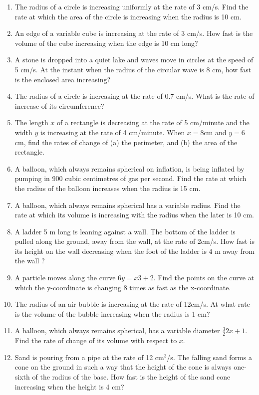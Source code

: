 \begin{enumerate}[label=\arabic*.,ref=\thesubsection.\theenumi]
\item The radius of a circle is increasing uniformly at the rate of 3 cm/s. Find the rate at which the area of the circle is increasing when the radius is 10 cm.
\item An edge of a variable cube is increasing at the rate of 3 cm/s. How fast is the volume of the cube increasing when the edge is 10 cm long?
\item A stone is dropped into a quiet lake and waves move in circles at the speed of 5 cm/s. At the instant when the radius of the circular wave is 8 cm, how fast is the enclosed area increasing?
%
\item The radius of a circle is increasing at the rate of 0.7 cm/s. What is the rate of increase of its circumference?
\item The length $x$ of a rectangle is decreasing at the rate of 5 cm/minute and the width $y$ is increasing at the rate of 4 cm/minute. When $x = 8$cm and $y = 6$cm, find the rates of change of (a) the perimeter, and (b) the area of the rectangle.
\item A balloon, which always remains spherical on inflation, is being inflated by pumping in 900 cubic centimetres of gas per second. Find the rate at which the radius of the balloon increases when the radius is 15 cm.
\item A balloon, which always remains spherical has a variable radius. Find the rate at which its volume is increasing with the radius when the later is 10 cm.
\item A ladder 5 m long is leaning against a wall. The bottom of the ladder is pulled along the ground, away from the wall, at the rate of 2cm/s. How fast is its height on the wall decreasing when the foot of the ladder is 4 m away from the wall ?
\item A particle moves along the curve $6y = x3 +2$. Find the points on the curve at which the y-coordinate is changing 8 times as fast as the x-coordinate.
\item The radius of an air bubble is increasing at the rate of 12cm/s.   At what rate is the
volume of the bubble increasing when the radius is 1 cm?
\item A balloon, which always remains spherical, has a variable diameter $\frac{3}{ 2}2x+1$.
Find the rate of change of its volume with respect to $x$.
\item Sand is pouring from a pipe at the rate of 12 cm$^3$/s. The falling sand forms a cone
on the ground in such a way that the height of the cone is always one-sixth of the radius of the base. How fast is the height of the sand cone increasing when the height is 4 cm?

\end{enumerate}
